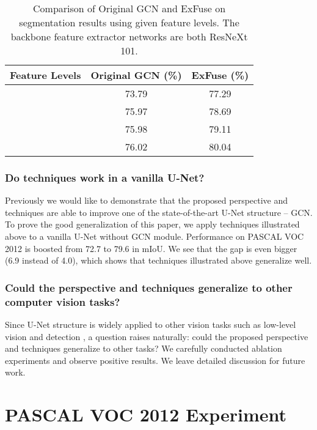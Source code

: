 \documentclass[runningheads]{llncs}
\begin{document}
\begin{table}
\begin{center}
\begin{tabular}{c|c|c}
\hline
Feature Levels & Original GCN \cite{Peng2017Large} (\%)& ExFuse (\%) \\
\hline
 & 73.79& 77.29 \\
\hline
 & 75.97& 78.69 \\
\hline
 & 75.98& 79.11\\
\hline
 & 76.02& 80.04\\
\hline
\end{tabular}
\end{center}

\caption{Comparison of Original GCN \cite{Peng2017Large} and ExFuse on segmentation results using given feature levels. The backbone feature extractor networks are both ResNeXt 101.}

\label{tbl:compfusion}
\end{table}

\subsubsection{Do techniques work in a vanilla U-Net?}
Previously we would like to demonstrate that the proposed perspective and techniques are able to improve one of the state-of-the-art U-Net structure -- GCN. To prove the good generalization of this paper, we apply techniques illustrated above to a vanilla U-Net without GCN module. Performance on PASCAL VOC 2012 is boosted from 72.7 to 79.6 in mIoU. We see that the gap is even bigger (6.9 instead of 4.0), which shows that techniques illustrated above generalize well.

\subsubsection{Could the perspective and techniques generalize to other computer vision tasks?}
Since U-Net structure is widely applied to other vision tasks such as low-level vision \cite{Shen2017Convolutional} and detection \cite{Lin2016Feature}, a question raises naturally: could the proposed perspective and techniques generalize to other tasks? We carefully conducted ablation experiments and observe positive results. We leave detailed discussion for future work.


\section{PASCAL VOC 2012 Experiment}
\end{document}
